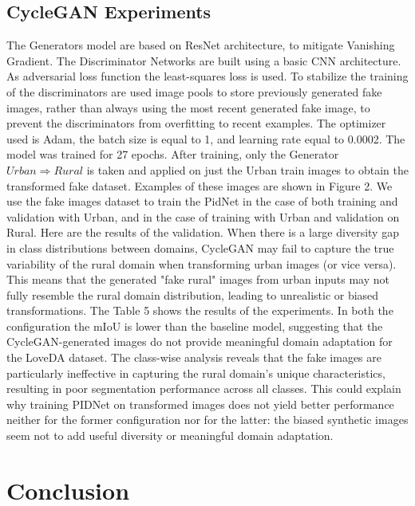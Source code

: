 \documentclass[10pt,twocolumn,letterpaper]{article}
\begin{document}
\subsection{CycleGAN Experiments}
The Generators model are based on ResNet architecture, to mitigate Vanishing Gradient. The Discriminator Networks are built using a basic CNN architecture. As adversarial loss function the least-squares loss is used. To stabilize the training of the discriminators are used image pools to store previously generated fake images, rather than always using the most recent generated fake image, to prevent the discriminators from overfitting to recent examples. The optimizer used is Adam, the batch size is equal to 1, and learning rate equal to 0.0002. The model was trained for 27 epochs. 
After training, only the Generator $Urban \Rightarrow Rural$ is taken and applied on just the Urban train images to obtain the transformed fake dataset. Examples of these images are shown in Figure 2.
We use the fake images dataset to train the PidNet in the case of both training and validation with Urban, and in the case of training with Urban and validation on Rural. Here are the results of the validation.
When there is a large diversity gap in class distributions between domains, CycleGAN may fail to capture the true variability of the rural domain when transforming urban images (or vice versa). This means that the generated "fake rural" images from urban inputs may not fully resemble the rural domain distribution, leading to unrealistic or biased transformations.
The Table 5 shows the results of the experiments. In both the configuration the mIoU is lower than the baseline model, suggesting that the CycleGAN-generated images do not provide meaningful domain adaptation for the LoveDA dataset. The class-wise analysis reveals that the fake images are particularly ineffective in capturing the rural domain's unique characteristics, resulting in poor segmentation performance across all classes. This could explain why training PIDNet on transformed images does not yield better performance neither for the former configuration nor for the latter: the biased synthetic images seem not to add useful diversity or meaningful domain adaptation. 

\section{Conclusion}
\end{document}
